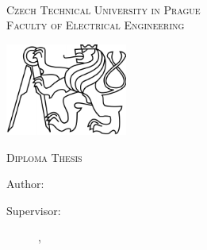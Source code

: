 \documentclass[a4paper,twoside,english,english,openright,cleardoublepage=empty,BCOR10mm,DIV11]{scrreprt}
\newcommand{\noun}[1]{\textsc{#1}}
\begin{document}
~\thispagestyle{empty}{\small ~\vfill{}
}{\small \par}

\noindent {\small \Thanks \newpage{}}{\small \par}

~\thispagestyle{empty}\vfill{}

\cleardoublepage{}~\thispagestyle{empty}\begin{center}\vspace{10mm}


\textsf{\textsc{\noun{\LARGE Czech Technical University in Prague}}}\\
\vspace{0.5em}
\textsf{\textsc{\noun{\LARGE Faculty of Electrical Engineering}}}\\
\vspace*{1em}
\textsf{\textsc{\noun{\Large \Department}}}\vspace{15mm}


\includegraphics[width=0.3\textwidth]{lev}\vspace{15mm}

\textsf{\textsc{\noun{\huge Diploma Thesis}}}{\huge \par}

\vspace{15mm}


\textsf{\textsc{\noun{\LARGE \Title}}}{\LARGE \par}


\vspace{10mm}


\end{center} 

\vspace*{\fill}


\vspace{10mm}


\begin{description}
\item [{{\large Author:}}] \noindent \textsf{\large \AuthorName}{\large \par}
\item [{{\large Supervisor:}}] \noindent \textsf{\large \SupervisorName}%
{\large \hfill{}}\textsf{\large \IssuedIn, \the\year}{\large{}
}{\large \par}
\end{description}
\clearpage{}
\end{document}
